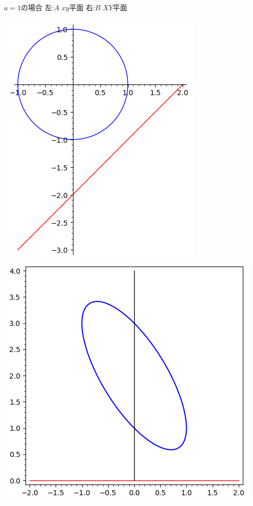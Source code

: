 \documentclass[10pt,b5paper]{ltjsarticle}
\begin{document}
$a=1$の場合
\quad
左:$A$ $xy$平面
\hfil
右:$B$ $XY$平面
\begin{center}
 \includegraphics[scale=0.6]{tra.png}
\hfill %
 \includegraphics[scale=0.6]{trb.png}
\end{center}

\dotfill
\end{document}
